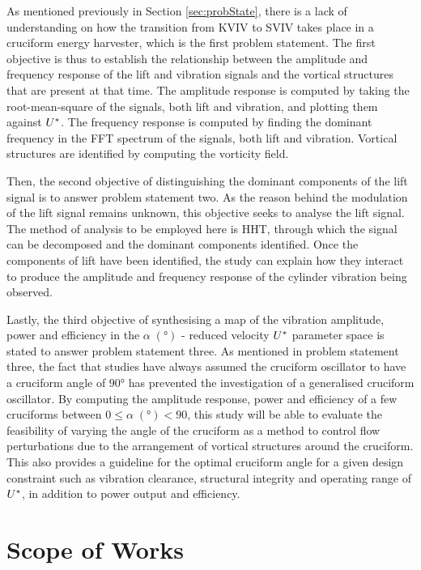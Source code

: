 \documentclass[oneside]{utmthesis}
\begin{document}
As mentioned previously in Section \ref{sec:probState}, there is a lack of understanding on how the transition from KVIV to SVIV takes place in a cruciform energy harvester, which is the first problem statement. The first objective is thus to establish the relationship between the amplitude and frequency response of the lift and vibration signals and the vortical structures that are present at that time. The amplitude response is computed by taking the root-mean-square of the signals, both lift and vibration, and plotting them against $U^{*}$. The frequency response is computed by finding the dominant frequency in the FFT spectrum of the signals, both lift and vibration. Vortical structures are identified by computing the vorticity field.

Then, the second objective of distinguishing the dominant components of the lift signal is to answer problem statement two. As the reason behind the modulation of the lift signal remains unknown, this objective seeks to analyse the lift signal. The method of analysis to be employed here is HHT, through which the signal can be decomposed and the dominant components identified. Once the components of lift have been identified, the study can explain how they interact to produce the amplitude and frequency response of the cylinder vibration being observed.

Lastly, the third objective of synthesising a map of the vibration amplitude, power and efficiency in the $\alpha \; (\si{\degree})$ - reduced velocity $U^{*}$ parameter space is stated to answer problem statement three. As mentioned in problem statement three, the fact that studies have always assumed the cruciform oscillator to have a cruciform angle of $90 \si{\degree}$ has prevented the investigation of a generalised cruciform oscillator. By computing the amplitude response, power and efficiency of a few cruciforms between $0 \leq \alpha \; (\si{\degree}) < 90$, this study will be able to evaluate the feasibility of varying the angle of the cruciform as a method to control flow perturbations due to the arrangement of vortical structures around the cruciform. This also provides a guideline for the optimal cruciform angle for a given design constraint such as vibration clearance, structural integrity and operating range of $U^{*}$, in addition to power output and efficiency.

\section{Scope of Works} \label{sec:scopeWork}
\end{document}
